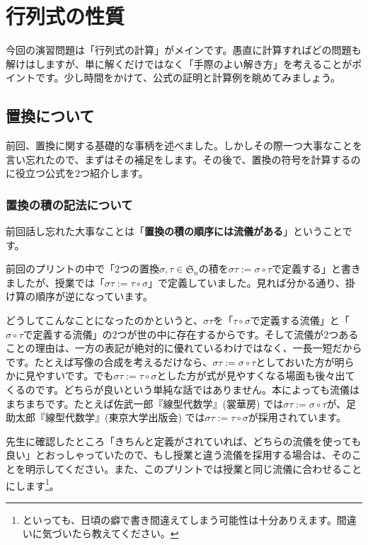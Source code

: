 \chapter{行列式の性質}

今回の演習問題は「行列式の計算」がメインです。愚直に計算すればどの問題も解けはしますが、単に解くだけではなく「手際のよい解き方」を考えることがポイントです。少し時間をかけて、公式の証明と計算例を眺めてみましょう。

\section{置換について}

前回、置換に関する基礎的な事柄を述べました。しかしその際一つ大事なことを言い忘れたので、まずはその補足をします。その後で、置換の符号を計算するのに役立つ公式を$2$つ紹介します。

\subsection{置換の積の記法について}
前回話し忘れた大事なことは「\textbf{置換の積の順序には流儀がある}」ということです。

前回のプリントの中で「$2$つの置換$\sigma, \tau \in \mathfrak{S}_n$の積を$\sigma\tau := \sigma \circ \tau$で定義する」と書きましたが、授業では「$\sigma\tau := \tau \circ \sigma$」で定義していました。見れば分かる通り、掛け算の順序が逆になっています。

どうしてこんなことになったのかというと、$\sigma\tau$を「$\tau \circ \sigma$で定義する流儀」と「$\sigma \circ \tau$で定義する流儀」の$2$つが世の中に存在するからです。そして流儀が$2$つあることの理由は、一方の表記が絶対的に優れているわけではなく、一長一短だからです。たとえば写像の合成を考えるだけなら、$\sigma\tau := \sigma \circ \tau$としておいた方が明らかに見やすいです。でも$\sigma \tau := \tau \circ \sigma$とした方が式が見やすくなる場面も後々出てくるのです。どちらが良いという単純な話ではありません。本によっても流儀はまちまちです。たとえば佐武一郎『線型代数学』(裳華房) では$\sigma\tau := \sigma \circ \tau$が、足助太郎『線型代数学』(東京大学出版会) では$\sigma \tau := \tau \circ \sigma$が採用されています。

先生に確認したところ「きちんと定義がされていれば、どちらの流儀を使っても良い」とおっしゃっていたので、もし授業と違う流儀を採用する場合は、そのことを明示してください。また、このプリントでは授業と同じ流儀に合わせることにします\footnote{といっても、日頃の癖で書き間違えてしまう可能性は十分ありえます。間違いに気づいたら教えてください。}。

